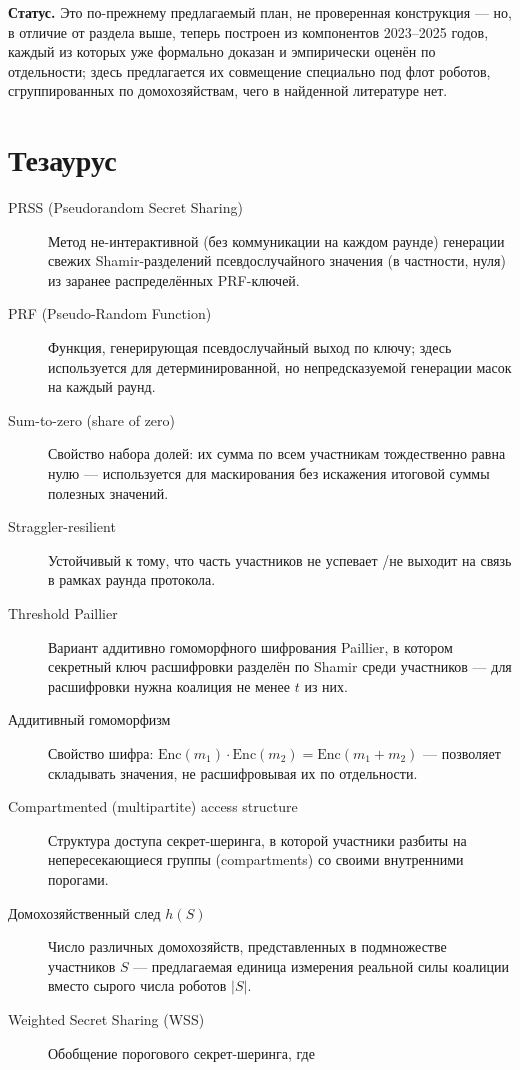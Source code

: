 \documentclass[11pt]{article}
\begin{document}
\textbf{Статус.} Это по-прежнему предлагаемый план, не проверенная конструкция —
но, в отличие от раздела выше, теперь построен из компонентов 2023--2025 годов,
каждый из которых уже формально доказан и эмпирически оценён по отдельности; здесь
предлагается их совмещение специально под флот роботов, сгруппированных по
домохозяйствам, чего в найденной литературе нет.

\section{Тезаурус}

\begin{description}
  \item[PRSS (Pseudorandom Secret Sharing)] Метод не-интерактивной (без
    коммуникации на каждом раунде) генерации свежих Shamir-разделений
    псевдослучайного значения (в частности, нуля) из заранее распределённых
    PRF-ключей.
  \item[PRF (Pseudo-Random Function)] Функция, генерирующая псевдослучайный выход
    по ключу; здесь используется для детерминированной, но непредсказуемой
    генерации масок на каждый раунд.
  \item[Sum-to-zero (share of zero)] Свойство набора долей: их сумма по всем
    участникам тождественно равна нулю — используется для маскирования без
    искажения итоговой суммы полезных значений.
  \item[Straggler-resilient] Устойчивый к тому, что часть участников не успевает
    /не выходит на связь в рамках раунда протокола.
  \item[Threshold Paillier] Вариант аддитивно гомоморфного шифрования Paillier, в
    котором секретный ключ расшифровки разделён по Shamir среди участников — для
    расшифровки нужна коалиция не менее $t$ из них.
  \item[Аддитивный гомоморфизм] Свойство шифра: $\mathrm{Enc}(m_1)\cdot
    \mathrm{Enc}(m_2) = \mathrm{Enc}(m_1+m_2)$ — позволяет складывать значения, не
    расшифровывая их по отдельности.
  \item[Compartmented (multipartite) access structure] Структура доступа
    секрет-шеринга, в которой участники разбиты на непересекающиеся группы
    (compartments) со своими внутренними порогами.
  \item[Домохозяйственный след $h(S)$] Число различных домохозяйств, представленных
    в подмножестве участников $S$ — предлагаемая единица измерения реальной силы
    коалиции вместо сырого числа роботов $|S|$.
  \item[Weighted Secret Sharing (WSS)] Обобщение порогового секрет-шеринга, где

\end{description}
\end{document}
